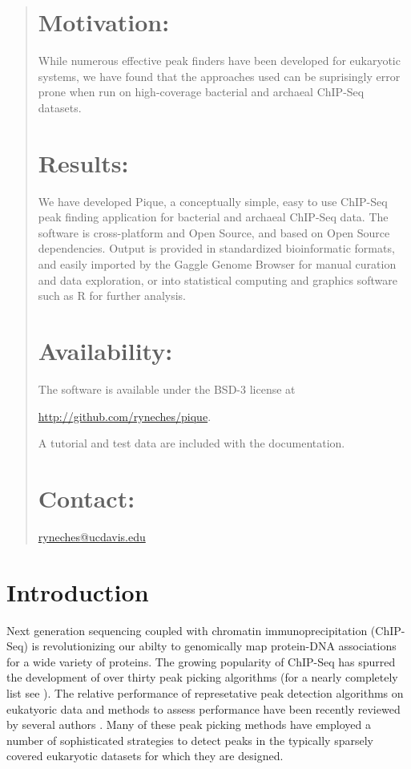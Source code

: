 \documentclass{bioinfo}
\begin{document}
\begin{abstract}
\section{Motivation:}

\noindent While numerous effective peak finders have been developed
for eukaryotic systems, we have found that the approaches used can be
suprisingly error prone when run on high-coverage bacterial and
archaeal ChIP-Seq datasets.


\section{Results:}

\noindent We have developed Pique, a conceptually simple, easy to use
ChIP-Seq peak finding application for bacterial and archaeal ChIP-Seq
data. The software is cross-platform and Open Source, and based on
Open Source dependencies. Output is provided in standardized
bioinformatic formats, and easily imported by the Gaggle Genome
Browser for manual curation and data exploration, or into statistical
computing and graphics software such as R for further analysis.

\section{Availability:} 

\noindent The software is available under the BSD-3 license at

\href{http://github.com/ryneches/pique}{http://github.com/ryneches/pique}.

\noindent A tutorial and test data are included with the documentation.

\section{Contact:} \href{ryneches@ucdavis.edu}{ryneches@ucdavis.edu}

\end{abstract}

\section{Introduction}

\noindent Next generation sequencing coupled with chromatin
immuno\-pre\-cipi\-tation (ChIP-Seq) is revolutionizing our abilty to
genomically map protein-DNA associations for a wide variety of
proteins.  The growing popularity of ChIP-Seq has spurred the
development of over thirty peak picking algorithms (for a nearly
completely list see \cite{wilbanks}). The relative performance of
represetative peak detection algorithms on eukatyoric data and methods
to assess performance have been recently reviewed by several authors
\cite{Pepke, Laajala_review, too_many_peak_callers, peakranger,
  peak_benchmark}.  Many of these peak picking methods have employed a
number of sophisticated strategies to detect peaks in the typically
sparsely covered eukaryotic datasets for which they are designed.
\end{document}
